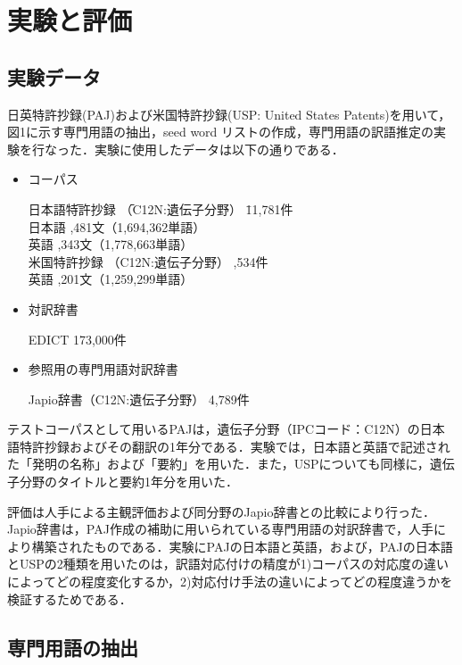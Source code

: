 \documentclass[japanese]{jnlp_1.3e}
\begin{document}
\section{実験と評価}

\subsection{実験データ}

日英特許抄録(PAJ)および米国特許抄録(USP: United States Patents)を用いて，図1に示す専門用語の抽出，seed word リストの作成，専門用語の訳語推定の実験を行なった．実験に使用したデータは以下の通りである．

\begin{itemize}
\item コーパス 
\begin{tabbing} 
日本語\=特許抄録 \=（C12N:遺伝子分野） \=  11,781件\\
 \>日本語  ,481文（1,694,362単語）\\
 \>英語    ,343文（1,778,663単語）\\
米国特\>許抄録 \>（C12N:遺伝子分野） ,534件\\
 \>英語	,201文（1,259,299単語）
 \end{tabbing}
\item 対訳辞書
 \begin{tabbing} 
	EDICT  173,000件
 \end{tabbing}
\item 参照用の専門用語対訳辞書
\begin{tabbing} 
  	Japio辞書（C12N:遺伝子分野）  4,789件
 \end{tabbing}
\end{itemize}

テストコーパスとして用いるPAJは，遺伝子分野（IPCコード：C12N）の日本語特許抄録およびその翻訳の1年分である．実験では，日本語と英語で記述された「発明の名称」および「要約」を用いた．また，USPについても同様に，遺伝子分野のタイトルと要約1年分を用いた．

評価は人手による主観評価および同分野のJapio辞書との比較により行った．Japio辞書は，PAJ作成の補助に用いられている専門用語の対訳辞書で，人手により構築されたものである．実験にPAJの日本語と英語，および，PAJの日本語とUSPの2種類を用いたのは，訳語対応付けの精度が1)コーパスの対応度の違いによってどの程度変化するか，2)対応付け手法の違いによってどの程度違うかを検証するためである．


\subsection{専門用語の抽出}
\label{sec:experimentTerm}
\end{document}
